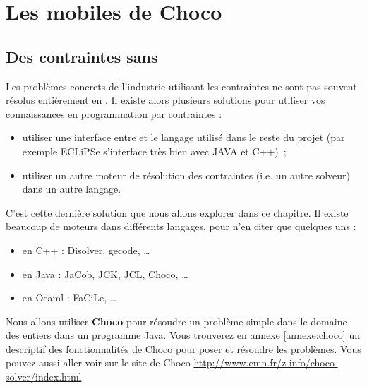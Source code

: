 
\chapter{Les mobiles de Choco}
\label{chapitre:choco}


\section{Des contraintes sans \prolog{}}

Les problèmes concrets de l'industrie utilisant les contraintes ne sont pas
souvent résolus entièrement en \prolog{}. Il existe alors plusieurs solutions pour
utiliser vos connaissances en programmation par contraintes :

\begin{itemize}

\item utiliser une interface entre \prolog{} et le langage utilisé dans le reste
      du projet (par exemple ECLiPSe s'interface très bien avec JAVA et C++)~;

\item utiliser un autre moteur de résolution des contraintes (i.e. un autre
      solveur) dans un autre langage. 

\end{itemize}

C'est cette dernière solution que nous allons explorer dans ce chapitre. Il
existe beaucoup de moteurs dans différents langages, pour n'en citer que
quelques uns :

\begin{itemize}
	\item en C++ : Disolver, gecode, \ldots
	\item en Java : JaCob, JCK, JCL, Choco, \ldots
	\item en Ocaml : FaCiLe, \ldots
\end{itemize}

Nous allons utiliser \textbf{Choco} pour résoudre un problème simple dans le
domaine des entiers dans un programme Java. Vous trouverez en annexe
\ref{annexe:choco} un descriptif des fonctionnalités de Choco pour poser et
résoudre les problèmes. Vous pouvez aussi aller voir sur le site de Choco
\url{http://www.emn.fr/z-info/choco-solver/index.html}. 

